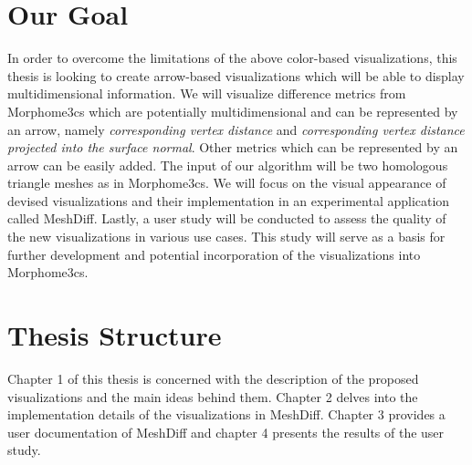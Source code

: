 \section*{Our Goal}

In order to overcome the limitations of the above color-based visualizations, this thesis is looking to create arrow-based visualizations which will be able to display multidimensional information. We will visualize difference metrics from Morphome3cs which are potentially multidimensional and can be represented by an arrow, namely {\it corresponding vertex distance} and {\it corresponding vertex distance projected into the surface normal}. Other metrics which can be represented by an arrow can be easily added. The input of our algorithm will be two homologous triangle meshes as in Morphome3cs. We will focus on the visual appearance of devised visualizations and their implementation in an experimental application called MeshDiff. Lastly, a user study will be conducted to assess the quality of the new visualizations in various use cases. This study will serve as a basis for further development and potential incorporation of the visualizations into Morphome3cs.
\section*{Thesis Structure}

Chapter 1 of this thesis is concerned with the description of the proposed visualizations and the main ideas behind them. Chapter 2 delves into the implementation details of the visualizations in MeshDiff. Chapter 3 provides a user documentation of MeshDiff and chapter 4 presents the results of the user study.